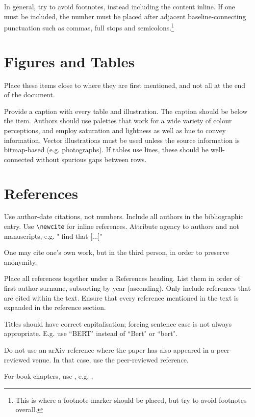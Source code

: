 \documentclass{article}
\begin{document}
In general, try to avoid footnotes, instead including the content inline. If one must be included, the number must be placed after adjacent baseline-connecting punctuation such as commas, full stops and semicolons.\footnote{This is where a footnote marker should be placed, but try to avoid footnotes overall.}

\section{Figures and Tables}

Place these items close to where they are first mentioned, and not all at the end of the document. 

Provide a caption with every table and illustration. The caption should be below the item. Authors should use palettes that work for a wide variety of colour perceptions, and employ saturation and lightness as well as hue to convey information. Vector illustrations must be used unless the source information is bitmap-based (e.g. photographs). If tables use lines, these should be well-connected without spurious gaps between rows.

\section{References}

Use author-date citations, not numbers. Include all authors in the bibliographic entry. Use {\tt {\textbackslash}newcite} for inline references. Attribute agency to authors and not manuscripts, e.g. " find that [...]"

One may cite one's own work, but in the third person, in order to preserve anonymity.

Place all references together under a References heading. List them in order of first author surname, subsorting by year (ascending). Only include references that are cited within the text. Ensure that every reference mentioned in the text is expanded in the reference section.

Titles should have correct capitalisation; forcing sentence case is not always appropriate. E.g. use ``BERT" instead of ``Bert" or ``bert".

Do not use an arXiv reference where the paper has also appeared in a peer-reviewed venue. In that case, use the peer-reviewed reference.

For book chapters, use \texttt{\@inbook}, e.g. \citet{swift}.
\end{document}
